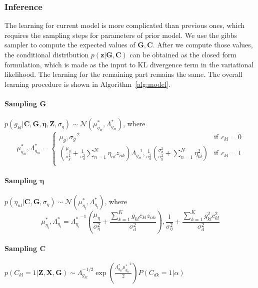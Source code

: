 \subsubsection{Inference}
The learning for current model is more complicated than previous ones, which requires the sampling steps for parameters of prior model. We use the gibbs sampler to compute the expected values of $\mathbf{G}, \mathbf{C}$. After we compute those values, the conditional distribution $p(\mathbf{z}|\mathbf{G},\mathbf{C})$ can be obtained as the closed form formulation, which is made as the input to KL divergence term in the variational likelihood. The learning for the remaining part remains the same. The overall learning procedure is shown in Algorithm~\ref{alg:model}.

\paragraph{Sampling $\mathbf{G}$} $p(g_{kl}|\mathbf{C},\mathbf{G},\mathbf{\eta}, \mathbf{Z},\sigma_g)\sim \mathcal{N}(\mu_{g_{kl}}^*, \Lambda_{g_{kl}}^*)$, where
\[ \mu_{g_{kl}}^*, \Lambda_{g_{kl}}^* =
  \begin{cases}
     \mu_g, \sigma_g^{-2}      & \text{if} ~~c_{kl} = 0\\
    \left(\frac{\mu_g}{\sigma_g^2}+\frac{1}{\sigma_d^2}\sum_{n=1}^{N}\eta_{nl}z_{nk}\right)\Lambda_{g_{kl}}^{-1}, \frac{1}{\sigma_d^2}\left(\frac{\sigma_d^2}{\sigma_g^2}+\sum_{n=1}^{N}\eta_{kl}^2\right)  & \text{if}~~ c_{kl} = 1\\
  \end{cases}
\]
\paragraph{Sampling $\mathbf{\eta}$} $p(\eta_{nl}|\mathbf{C},\mathbf{G},\sigma_{\eta})\sim \mathcal{N}(\mu_{\eta_l}^*, \Lambda_{\eta_{l}}^*)$, where
\[
\mu_{\eta_l}^*, \Lambda_{\eta_{l}}^*={\Lambda_{\eta_l}^*}^{-1}\left(\frac{\mu_\eta}{\sigma_{\eta}^2}+\frac{\sum_{k=1}^{K}g_{kl}c_{kl}z_{nk}}{\sigma_d^2}\right),
\frac{1}{\sigma_{\eta}^2}+\frac{\sum_{k=1}^{K}g_{kl}^2c_{kl}^2}{\sigma_d^2}
\]

\paragraph{Sampling $\mathbf{C}$} $p(C_{kl}=1|\mathbf{Z}, \mathbf{X}, \mathbf{G}) \sim \Lambda_{g_{kl}}^{-1/2}\exp(\frac{\Lambda_{g_{kl}}^{\ast}{\mu_{g_{kl}}^{\ast}}^2}{2})P(C_{dk}=1|\alpha)$



